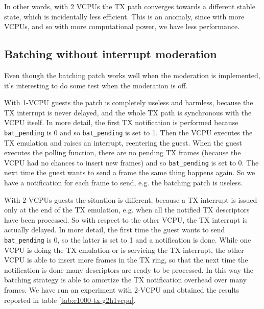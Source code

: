 \vspace{0.5cm}

In other words, with 2 VCPUs the TX path converges towards a different stable state, which is incidentally less efficient. This is an 
anomaly, since with more VCPUs, and so with more computational power, we have less performance.



\subsection{Batching without interrupt moderation}
Even though the batching patch works well when the moderation is implemented, it's interesting to do some test when the moderation is off.

\vspace{0.5cm}

With 1-VCPU guests the patch is completely useless and harmless, because the TX interrupt is never delayed, and the whole TX path is
synchronous with the VCPU itself. In more detail, the first TX notification is performed because \texttt{bat\_pending} is 0 and so
\texttt{bat\_pending} is set to 1. Then the VCPU executes the TX emulation and raises an interrupt, reentering the guest. When
the guest executes the polling function, there are no pending TX frames (because the VCPU had no chances to insert new frames) and so
\texttt{bat\_pending} is set to 0. The next time the guest wants to send a frame the same thing happens again. So we have a notification
for each frame to send, e.g. the batching patch is useless.

\vspace{0.5cm}

With 2-VCPUs guests the situation is different, because a TX interrupt is issued only at the end of the TX emulation, e.g. when all the
notified TX descriptors have been processed. So with respect to the other VCPU, the TX interrupt is actually delayed.
In more detail, the first time the guest wants to send \texttt{bat\_pending} is 0, so the latter is set to 1 and a notification is done.
While one VCPU is doing the TX emulation or is servicing the TX interrupt, the other VCPU is able to insert more frames in the TX ring,
so that the next time the notification is done many descriptors are ready to be processed. In this way the batching strategy is able
to amortize the TX notification overhead over many frames. We have run an experiment with 2-VCPU and obtained the results reported in
table \ref{tab:e1000-tx-g2h1vcpu}.

